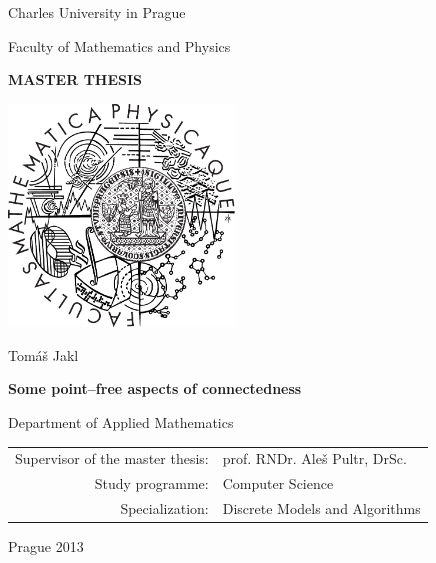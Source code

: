 
\pagestyle{empty}
\begin{center}

{\large Charles University in Prague}

\medskip
{\large Faculty of Mathematics and Physics}

\vfill
{\bfseries\Large MASTER THESIS}

\vfill
\centerline{\mbox{\includegraphics[width=60mm]{mfflogo.pdf}}}

\vfill
\vspace{5mm}

{\LARGE Tom\'a\v s Jakl}

\vspace{15mm}

{\LARGE\bfseries Some point--free aspects of connectedness}

\vfill

Department of Applied Mathematics

\vfill

\begin{tabular}{rl}
Supervisor of the master thesis: & prof. RNDr. Aleš Pultr, DrSc. \\   
\noalign{\vspace{2mm}}
Study programme: & Computer Science\\
\noalign{\vspace{2mm}}
Specialization: & Discrete Models and Algorithms\\
\end{tabular}

\vfill

Prague 2013

\end{center}



